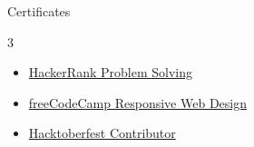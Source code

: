 \documentclass{resume}
\begin{document}
\begin{rSection}{Certificates}
\begin{multicols}{3}
\begin{itemize}
  \item \href{https://www.hackerrank.com/certificates/73bb80c83be4}{HackerRank Problem Solving}
  \item \href{https://www.freecodecamp.org/certification/Roshan_kumar7989/responsive-web-design}{freeCodeCamp Responsive Web Design}
  \item \href{https://tree-nation.com/certificate/6525e97fbca2d}{Hacktoberfest Contributor}
\end{itemize}
\end{multicols}
\end{rSection}


\end{document}
